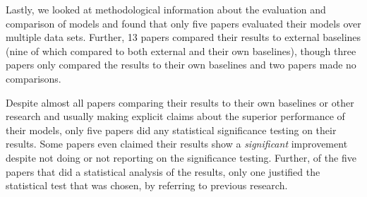 \documentclass[a4paper]{article}
\begin{document}
Lastly, we looked at methodological information about the evaluation and comparison of models and found that only five papers evaluated their models over multiple data sets. Further, 13 papers compared their results to external baselines (nine of which compared to both external and their own baselines), though three papers only compared the results to their own baselines and two papers made no comparisons. 

Despite almost all papers comparing their results to their own baselines or other research and usually making explicit claims about the superior performance of their models, only five papers did any statistical significance testing on their results. Some papers even claimed their results show a \textit{significant} improvement despite not doing or not reporting on the significance testing. Further, of the five papers that did a statistical analysis of the results, only one justified the statistical test that was chosen, by referring to previous research. 
\end{document}

